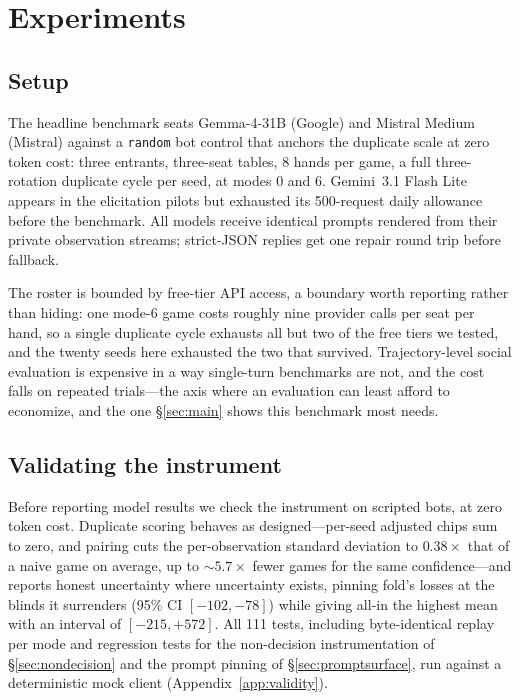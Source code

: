 \documentclass{article}
\begin{document}
\section{Experiments}
\label{sec:experiments}

\subsection{Setup}
\label{sec:setup}

The headline benchmark seats Gemma-4-31B (Google) and Mistral Medium
(Mistral) against a \texttt{random} bot control that anchors the duplicate
scale at zero token cost: three entrants, three-seat tables, 8 hands per
game, a full three-rotation duplicate cycle per seed, at modes 0 and 6.
Gemini~3.1 Flash Lite appears in the elicitation pilots but exhausted its
500-request daily allowance before the benchmark. All models receive
identical prompts rendered from their private observation streams;
strict-JSON replies get one repair round trip before fallback.

The roster is bounded by free-tier API access, a boundary worth reporting
rather than hiding: one mode-6 game costs roughly nine provider calls per
seat per hand, so a single duplicate cycle exhausts all but two of the free
tiers we tested, and the twenty seeds here exhausted the two that survived.
Trajectory-level social evaluation is expensive in a way single-turn
benchmarks are not, and the cost falls on repeated trials---the axis where
an evaluation can least afford to economize, and the one \S\ref{sec:main}
shows this benchmark most needs.

\subsection{Validating the instrument}
\label{sec:validity}

Before reporting model results we check the instrument on scripted bots, at
zero token cost. Duplicate scoring behaves as designed---per-seed adjusted
chips sum to zero, and pairing cuts the per-observation standard deviation
to $0.38\times$ that of a naive game on average, up to ${\sim}5.7\times$
fewer games for the same confidence---and reports honest uncertainty where
uncertainty exists, pinning fold's losses at the blinds it surrenders
(95\% CI $[-102,-78]$) while giving all-in the highest mean with an
interval of $[-215,+572]$. All 111 tests, including byte-identical replay
per mode and regression tests for the non-decision instrumentation of
\S\ref{sec:nondecision} and the prompt pinning of
\S\ref{sec:promptsurface}, run against a deterministic mock client
(Appendix~\ref{app:validity}).
\end{document}
